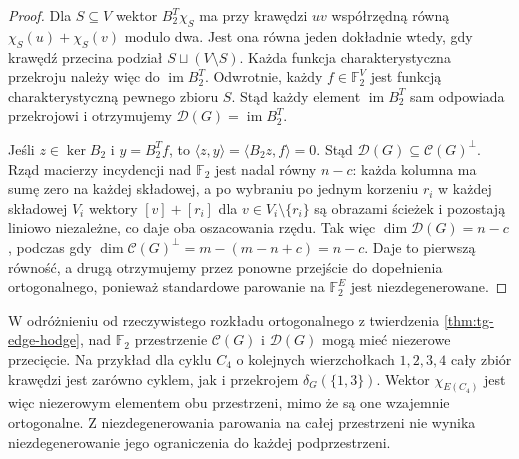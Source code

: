 \begin{proof}
Dla $S\subseteq V$ wektor $B_2^T\chi_S$
ma przy krawędzi $uv$ współrzędną równą
$\chi_S(u)+\chi_S(v)$ modulo dwa. Jest ona równa
jeden dokładnie wtedy, gdy krawędź przecina podział
$S\sqcup(V\setminus S)$. Każda funkcja charakterystyczna przekroju należy więc do
$\operatorname{im}B_2^T$. Odwrotnie, każdy $f\in\mathbb F_2^V$
jest funkcją charakterystyczną pewnego zbioru $S$.
Stąd każdy element $\operatorname{im}B_2^T$ sam odpowiada
przekrojowi i otrzymujemy $\mathcal D(G)=\operatorname{im}B_2^T$.

Jeśli $z\in\ker B_2$ i $y=B_2^Tf$, to
$\langle z,y\rangle=\langle B_2z,f\rangle=0$.
Stąd $\mathcal D(G)\subseteq\mathcal C(G)^\perp$.
Rząd macierzy incydencji nad $\mathbb F_2$ jest nadal
równy $n-c$: każda kolumna ma sumę zero na każdej składowej,
a po wybraniu po jednym korzeniu $r_i$ w każdej składowej $V_i$
wektory $[v]+[r_i]$ dla $v\in V_i\setminus\{r_i\}$
są obrazami ścieżek i pozostają liniowo niezależne,
co daje oba oszacowania rzędu.
Tak więc $\dim\mathcal D(G)=n-c$, podczas gdy
$\dim\mathcal C(G)^\perp=m-(m-n+c)=n-c$.
Daje to pierwszą równość, a drugą otrzymujemy przez
ponowne przejście do dopełnienia ortogonalnego,
ponieważ standardowe parowanie na $\mathbb F_2^E$
jest niezdegenerowane.
\end{proof}

\begin{uwaga}
W odróżnieniu od rzeczywistego rozkładu ortogonalnego
z twierdzenia \ref{thm:tg-edge-hodge}, nad $\mathbb F_2$
przestrzenie $\mathcal C(G)$ i $\mathcal D(G)$
mogą mieć niezerowe przecięcie.
Na przykład dla cyklu $C_4$ o kolejnych wierzchołkach
$1,2,3,4$ cały zbiór krawędzi jest zarówno cyklem,
jak i przekrojem $\delta_G(\{1,3\})$.
Wektor $\chi_{E(C_4)}$ jest więc niezerowym
elementem obu przestrzeni, mimo że są one wzajemnie
ortogonalne. Z niezdegenerowania parowania na całej
przestrzeni nie wynika niezdegenerowanie jego
ograniczenia do każdej podprzestrzeni.
\end{uwaga}

